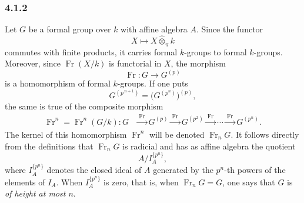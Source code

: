 
\subsubsection*{4.1.2}
\label{sga3:VIIB:4.1.2}

Let \(G\) be a formal group over \(k\) with affine algebra \(A\). Since
the functor
\[
  X\longmapsto
  X\widehat\otimes_\pi k
\]
commutes with finite products, it carries formal \(k\)-groups to
formal \(k\)-groups. Moreover, since \(\operatorname{Fr}(X/k)\) is
functorial in \(X\), the morphism
\[
  \operatorname{Fr}:G\longrightarrow G^{(p)}
\]
is a homomorphism of formal \(k\)-groups. If one puts
\[
  G^{(p^{\,n+1})}
  =
  \bigl(G^{(p^n)}\bigr)^{(p)},
\]
the same is true of the composite morphism
\[
\begin{aligned}
  \operatorname{Fr}^{n}
  =
  \operatorname{Fr}^{n}(G/k):
  G
  &\xrightarrow{\ \operatorname{Fr}\ }
  G^{(p)}
  \xrightarrow{\ \operatorname{Fr}\ }
  G^{(p^2)}
  \xrightarrow{\ \operatorname{Fr}\ }
  \cdots
  \xrightarrow{\ \operatorname{Fr}\ }
  G^{(p^n)}.
\end{aligned}
\]
The kernel of this homomorphism \(\operatorname{Fr}^{n}\) will be
denoted \(\operatorname{Fr}_nG\). It follows directly from the
definitions that \(\operatorname{Fr}_nG\) is radicial and has as
affine algebra the quotient
\[
  A/I_A^{\{p^n\}},
\]
where \(I_A^{\{p^n\}}\) denotes the closed ideal of \(A\) generated
by the \(p^n\)-th powers of the elements of \(I_A\). When
\(I_A^{\{p^n\}}\) is zero, that is, when
\(\operatorname{Fr}_nG=G\), one says that \(G\) is \emph{of height
at most \(n\)}.
